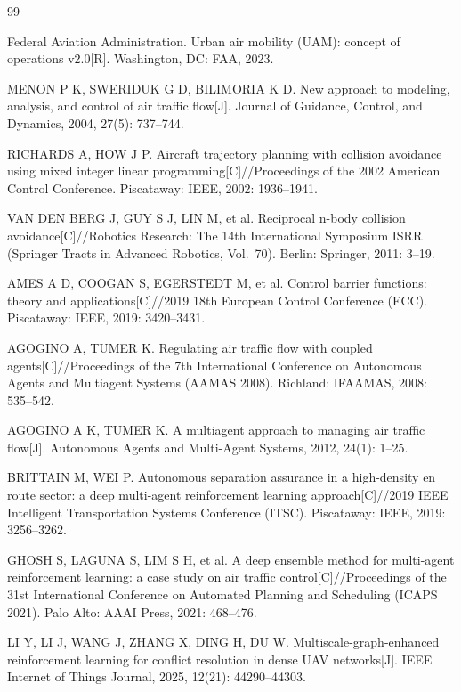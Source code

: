 \documentclass[12pt,a4paper,UTF8]{ctexart}
\begin{document}
\begin{thebibliography}{99}

 Federal Aviation Administration. Urban air mobility (UAM): concept of operations v2.0[R]. Washington, DC: FAA, 2023.

 MENON P K, SWERIDUK G D, BILIMORIA K D. New approach to modeling, analysis, and control of air traffic flow[J]. Journal of Guidance, Control, and Dynamics, 2004, 27(5): 737--744.

 RICHARDS A, HOW J P. Aircraft trajectory planning with collision avoidance using mixed integer linear programming[C]//Proceedings of the 2002 American Control Conference. Piscataway: IEEE, 2002: 1936--1941.

 VAN DEN BERG J, GUY S J, LIN M, et al. Reciprocal n-body collision avoidance[C]//Robotics Research: The 14th International Symposium ISRR (Springer Tracts in Advanced Robotics, Vol.\ 70). Berlin: Springer, 2011: 3--19.

 AMES A D, COOGAN S, EGERSTEDT M, et al. Control barrier functions: theory and applications[C]//2019 18th European Control Conference (ECC). Piscataway: IEEE, 2019: 3420--3431.

 AGOGINO A, TUMER K. Regulating air traffic flow with coupled agents[C]//Proceedings of the 7th International Conference on Autonomous Agents and Multiagent Systems (AAMAS 2008). Richland: IFAAMAS, 2008: 535--542.

 AGOGINO A K, TUMER K. A multiagent approach to managing air traffic flow[J]. Autonomous Agents and Multi-Agent Systems, 2012, 24(1): 1--25.

 BRITTAIN M, WEI P. Autonomous separation assurance in a high-density en route sector: a deep multi-agent reinforcement learning approach[C]//2019 IEEE Intelligent Transportation Systems Conference (ITSC). Piscataway: IEEE, 2019: 3256--3262.

 GHOSH S, LAGUNA S, LIM S H, et al. A deep ensemble method for multi-agent reinforcement learning: a case study on air traffic control[C]//Proceedings of the 31st International Conference on Automated Planning and Scheduling (ICAPS 2021). Palo Alto: AAAI Press, 2021: 468--476.

 LI Y, LI J, WANG J, ZHANG X, DING H, DU W. Multiscale-graph-enhanced reinforcement learning for conflict resolution in dense UAV networks[J]. IEEE Internet of Things Journal, 2025, 12(21): 44290--44303.


\end{thebibliography}
\end{document}
